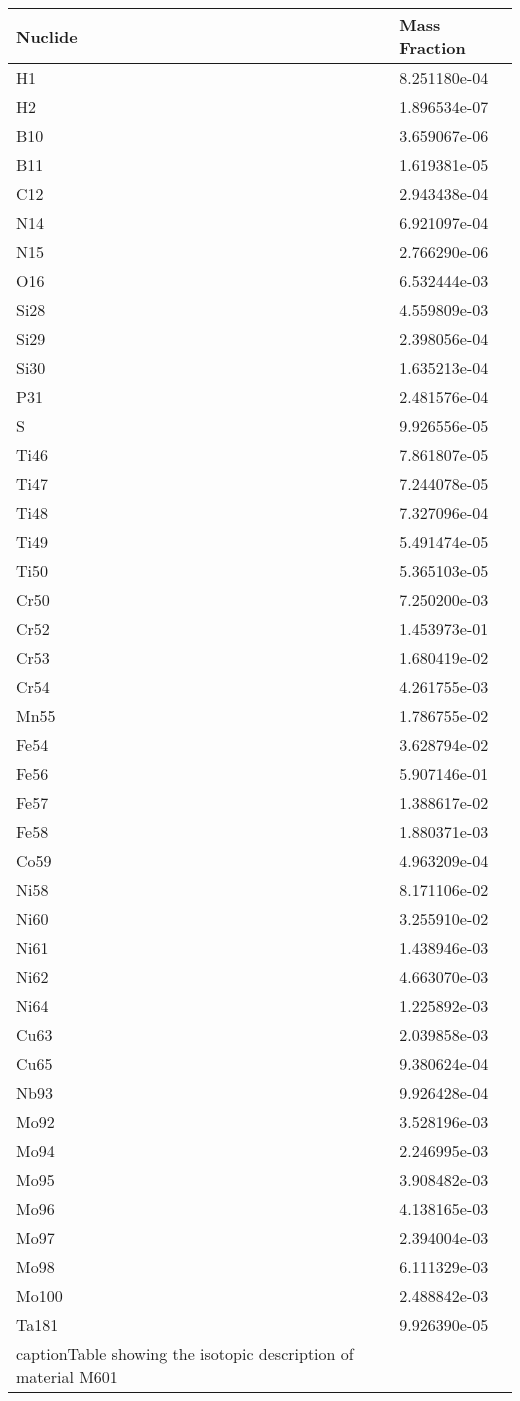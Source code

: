 \begin{centering}
\begin{longtable}[ht!]
{ p{} | p{} }
\hline
Nuclide & Mass Fraction\\
\hline
H1 & 8.251180e-04\\
H2 & 1.896534e-07\\
B10 & 3.659067e-06\\
B11 & 1.619381e-05\\
C12 & 2.943438e-04\\
N14 & 6.921097e-04\\
N15 & 2.766290e-06\\
O16 & 6.532444e-03\\
Si28 & 4.559809e-03\\
Si29 & 2.398056e-04\\
Si30 & 1.635213e-04\\
P31 & 2.481576e-04\\
S & 9.926556e-05\\
Ti46 & 7.861807e-05\\
Ti47 & 7.244078e-05\\
Ti48 & 7.327096e-04\\
Ti49 & 5.491474e-05\\
Ti50 & 5.365103e-05\\
Cr50 & 7.250200e-03\\
Cr52 & 1.453973e-01\\
Cr53 & 1.680419e-02\\
Cr54 & 4.261755e-03\\
Mn55 & 1.786755e-02\\
Fe54 & 3.628794e-02\\
Fe56 & 5.907146e-01\\
Fe57 & 1.388617e-02\\
Fe58 & 1.880371e-03\\
Co59 & 4.963209e-04\\
Ni58 & 8.171106e-02\\
Ni60 & 3.255910e-02\\
Ni61 & 1.438946e-03\\
Ni62 & 4.663070e-03\\
Ni64 & 1.225892e-03\\
Cu63 & 2.039858e-03\\
Cu65 & 9.380624e-04\\
Nb93 & 9.926428e-04\\
Mo92 & 3.528196e-03\\
Mo94 & 2.246995e-03\\
Mo95 & 3.908482e-03\\
Mo96 & 4.138165e-03\\
Mo97 & 2.394004e-03\\
Mo98 & 6.111329e-03\\
Mo100 & 2.488842e-03\\
Ta181 & 9.926390e-05\\
caption{Table showing the isotopic description of material M601}
\label{table:material_M601}
\end{longtable}\clearpage


\end{centering}

